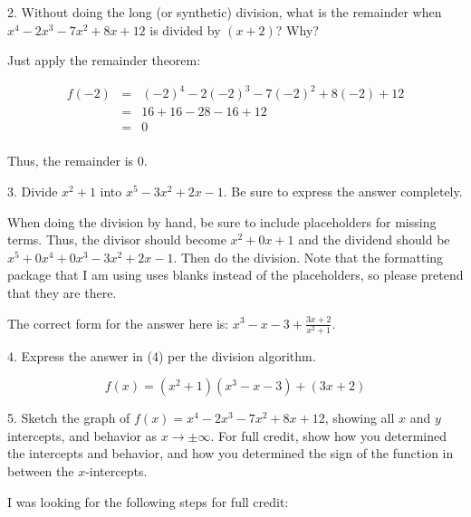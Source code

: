 \documentclass[letterpaper, 12pt]{article}
\begin{document}
2. Without doing the long (or synthetic) division, what is the remainder when
$x^4-2x^3-7x^2+8x+12$ is divided by $(x+2)$? Why?

\bigskip

Just apply the remainder theorem:

\begin{eqnarray*}
f(-2) &=& (-2)^4-2(-2)^3-7(-2)^2+8(-2)+12 \\
      &=& 16+16-28-16+12 \\
      &=& 0 \\
\end{eqnarray*}

Thus, the remainder is 0.

\bigskip

3. Divide $x^2+1$ into $x^5-3x^2+2x-1$. Be sure to express the answer
completely.

\bigskip

When doing the division by hand, be sure to include placeholders for missing
terms.  Thus, the divisor should become $x^2+0x+1$ and the dividend should be
$x^5+0x^4+0x^3-3x^2+2x-1$. Then do the division. Note that the formatting
package that I am using uses blanks instead of the placeholders, so please
pretend that they are there.

\bigskip


\bigskip

The correct form for the answer here is: $x^3-x-3+\frac{3x+2}{x^2+1}$.

\bigskip

4. Express the answer in (4) per the division algorithm.

\[f(x)=(x^2+1)(x^3-x-3)+(3x+2)\]

5. Sketch the graph of $f(x)=x^4-2x^3-7x^2+8x+12$, showing all $x$ and $y$
intercepts, and behavior as $x\to\pm\infty$. For full credit, show how you
determined the intercepts and behavior, and how you determined the sign of
the function in between the $x$-intercepts.

\bigskip

I was looking for the following steps for full credit:
\end{document}
